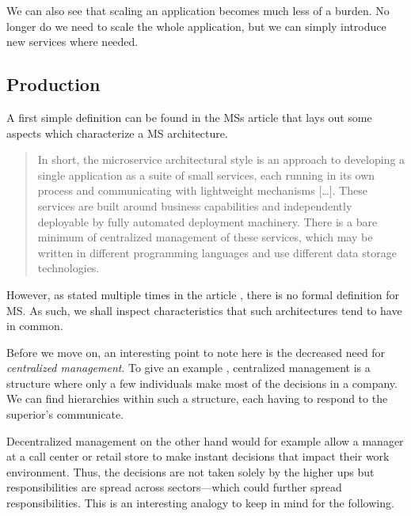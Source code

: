 We can also see that scaling an application becomes much less of a
burden. No longer do we need to scale the whole application, but we
can simply introduce new services where needed.

\subsection{Production}%

A first simple definition can be found in the MSs article
\cite{ms-definition} that lays out some aspects which characterize a
MS architecture.

\begin{quote}
	In short, the microservice architectural style is an approach to
	developing a single application as a suite of small services,
	each running in its own process and communicating with lightweight
	mechanisms [\ldots]. These services are built around business
	capabilities and independently deployable by fully automated
	deployment machinery.  There
	is a bare minimum of centralized management of these services, which
	may be written in different programming languages and use different
	data storage technologies. 
\end{quote}

However, as stated multiple times in the article \cite{ms-definition},
there is no formal definition for MS. As such, we shall inspect
characteristics that such architectures tend to have in common.

Before we move on, an interesting point to note here is the decreased
need for \textit{centralized management}. To give an example
\cite{central-decentral}, centralized management is a structure where
only a few individuals make most of the decisions in a company. We can
find hierarchies within such a structure, each having to respond to
the superior's communicate. 

Decentralized management on the other hand would for example allow a
manager at a call center or retail store to make instant decisions
that impact their work environment. Thus, the decisions are not taken
solely by the higher ups but responsibilities are spread across
sectors—which could further spread responsibilities. This is an
interesting analogy to keep in mind for the following.

